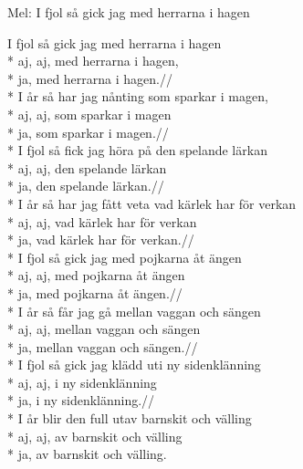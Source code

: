 \begin{SongText}
    \begin{SongInfo}
        Mel: I fjol så gick jag med herrarna i hagen
    \end{SongInfo}
    \begin{SongVerse}
        I fjol så gick jag med herrarna i hagen\\*%
        aj, aj, med herrarna i hagen,\\*%
        ja, med herrarna i hagen.//\\*%
        I år så har jag nånting som sparkar i magen,\\*%
        aj, aj, som sparkar i magen\\*%
        ja, som sparkar i magen.//\\*%
        I fjol så fick jag höra på den spelande lärkan\\*%
        aj, aj, den spelande lärkan\\*%
        ja, den spelande lärkan.//\\*%
        I år så har jag fått veta vad kärlek har för verkan\\*%
        aj, aj, vad kärlek har för verkan\\*%
        ja, vad kärlek har för verkan.//\\*%
        I fjol så gick jag med pojkarna åt ängen\\*%
        aj, aj, med pojkarna åt ängen\\*%
        ja, med pojkarna åt ängen.//\\*%
        I år så får jag gå mellan vaggan och sängen\\*%
        aj, aj, mellan vaggan och sängen\\*%
        ja, mellan vaggan och sängen.//\\*%
        I fjol så gick jag klädd uti ny sidenklänning\\*%
        aj, aj, i ny sidenklänning\\*%
        ja, i ny sidenklänning.//\\*%
        I år blir den full utav barnskit och välling\\*%
        aj, aj, av barnskit och välling\\*%
        ja, av barnskit och välling.
    \end{SongVerse}
\end{SongText}

